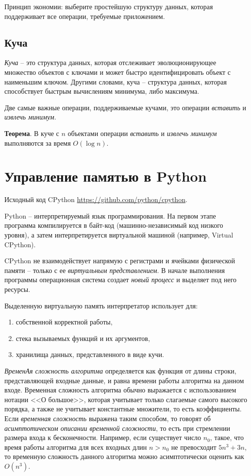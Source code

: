 \documentclass[%
	11pt,
	a4paper,
	utf8,
		]{article}
\begin{document}
Принцип экономии: выберите простейшую структуру данных, которая поддерживает все операции, требуемые приложением.

\subsection{Куча}

\emph{Куча} -- это структура данных, которая отслеживает эволюционирующее множество объектов с ключами и может быстро идентифицировать объект с наименьшим ключом. Другими словами, куча -- структура данных, которая способствует быстрым вычислениям минимума, либо максимума.

Две самые важные операции, поддерживаемые кучами, это операции \emph{вставить} и \emph{извлечь минимум}.

\textbf{Теорема}. В куче с $ n $ объектами операции \emph{вставить} и \emph{извлечь минимум} выполняются за время $ O(\log n) $.


\section{Управление памятью в Python}

Исходный код CPython \url{https://github.com/python/cpython}.

Python -- интерпретируемый язык программирования. На первом этапе программа компилируется в байт-код (машинно-независимый код низкого уровня), а затем интерпретируется виртуальной машиной (например, Virtual CPython).

CPython не взаимодействует напрямую с регистрами и ячейками  физической памяти -- только с ее \emph{виртуальным представлением}. В начале выполнения программы операционная система создает \emph{новый процесс} и выделяет под него ресурсы.

Выделенную виртуальную память интерпретатор использует для:
\begin{enumerate}
	\item собственной корректной работы,
	
	\item стека вызываемых функций и их аргументов,
	
	\item хранилища данных, представленного в виде кучи.
\end{enumerate}

\emph{ВременАя сложность алгоритма} определяется как функция от длины строки, представляющей входные данные, и равна времени работы алгоритма на данном входе. Временная сложность алгоритма обычно выражается с использованием нотации <<О большое>>, которая учитывает только слагаемые самого высокого порядка, а также не учитывает константные множители, то есть коэффициенты. Если \emph{временная сложность} выражена таким способом, то говорят об \emph{асимптотическом описании временной сложности}, то есть при стремлении размера входа к бесконечности. Например, если существует число $ n_0 $, такое, что время работы алгоритма для всех входных длин $ n > n_0 $ не превосходит $ 5 n^3 + 3 n $, то временную сложность данного алгоритма можно асимптотически оценить как $ O(n^3) $.
\end{document}

